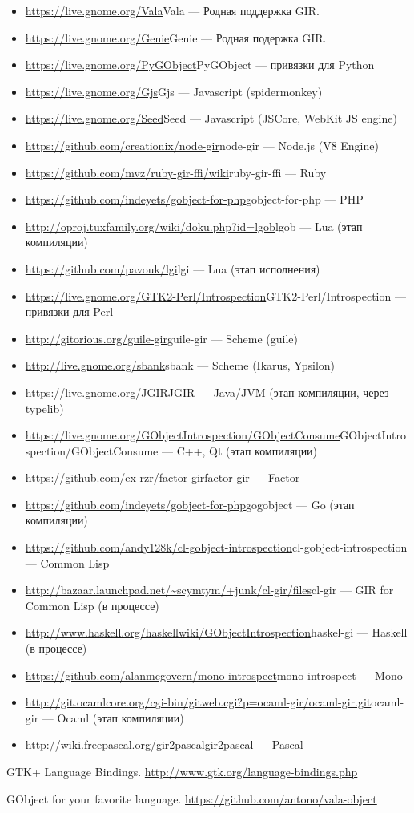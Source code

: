 \documentclass[10pt, a5paper]{article}
\begin{document}
\begin{itemize}
  \item \url{https://live.gnome.org/Vala}{Vala} --- Родная поддержка GIR.
  \item \url{https://live.gnome.org/Genie}{Genie} --- Родная подержка GIR.
  \item \url{https://live.gnome.org/PyGObject}{PyGObject} --- привязки для Python
  \item \url{https://live.gnome.org/Gjs}{Gjs} --- Javascript (spidermonkey)
  \item \url{https://live.gnome.org/Seed}{Seed} --- Javascript (JSCore, WebKit JS engine)
  \item \url{https://github.com/creationix/node-gir}{node-gir} --- Node.js (V8 Engine)
  \item \url{https://github.com/mvz/ruby-gir-ffi/wiki}{ruby-gir-ffi} --- Ruby
  \item \url{https://github.com/indeyets/gobject-for-php}{gobject-for-php} --- PHP
  \item \url{http://oproj.tuxfamily.org/wiki/doku.php?id=lgob}{lgob} --- Lua (этап компиляции)
  \item \url{https://github.com/pavouk/lgi}{lgi} --- Lua (этап исполнения)
  \item \url{https://live.gnome.org/GTK2-Perl/Introspection}{GTK2-Perl/Introspection} --- привязки для Perl
  \item \url{http://gitorious.org/guile-gir}{guile-gir} --- Scheme (guile)
  \item \url{http://live.gnome.org/sbank}{sbank} --- Scheme (Ikarus, Ypsilon)
  \item \url{https://live.gnome.org/JGIR}{JGIR} --- Java/JVM (этап компиляции, через typelib)
  \item \url{https://live.gnome.org/GObjectIntrospection/GObjectConsume}{GObjectIntrospection/GObjectConsume} --- C++, Qt (этап компиляции)
  \item \url{https://github.com/ex-rzr/factor-gir}{factor-gir} --- Factor
  \item \url{https://github.com/indeyets/gobject-for-php}{gogobject} --- Go (этап компиляции)
  \item \url{https://github.com/andy128k/cl-gobject-introspection}{cl-gobject-introspection} --- Common Lisp
  \item \url{http://bazaar.launchpad.net/~scymtym/+junk/cl-gir/files}{cl-gir} --- GIR for Common Lisp (в процессе)
  \item \url{http://www.haskell.org/haskellwiki/GObjectIntrospection}{haskel-gi} --- Haskell (в процессе)
  \item \url{https://github.com/alanmcgovern/mono-introspect}{mono-introspect} --- Mono
  \item \url{http://git.ocamlcore.org/cgi-bin/gitweb.cgi?p=ocaml-gir/ocaml-gir.git}{ocaml-gir} --- Ocaml (этап компиляции)
  \item \url{http://wiki.freepascal.org/gir2pascal}{gir2pascal} --- Pascal
\end{itemize}



\begin{thebibliography}{9}

 GTK+ Language Bindings. \url{http://www.gtk.org/language-bindings.php}

 GObject for your favorite language. \url{https://github.com/antono/vala-object}

\end{thebibliography}
\end{document}
